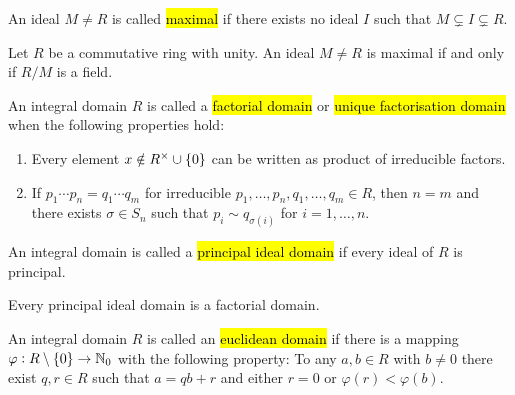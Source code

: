 \begin{definition}
	An ideal $M \neq R$ is called \hl{maximal} if there exists no ideal $I$ such that $M \subsetneq I \subsetneq R$.
\end{definition}

\vspace{1mm}

\begin{lemma}
	Let $R$ be a commutative ring with unity. An ideal $M \neq R$ is maximal if and only if $R/M$ is a field.
\end{lemma}

\vspace{1mm}

\begin{definition}
	An integral domain $R$ is called a \hl{factorial domain} or \hl{unique factorisation domain} when the following properties hold: 

	\begin{enumerate}[label = \textup{(}\roman*\textup{)}]
		\item Every element $x \notin R^\times \cup \cbr[0]{0}$ can be written as product of irreducible factors.

		\item If $p_1 \cdots p_n = q_1 \cdots q_m$ for irreducible $p_1,\dots,p_n,q_1,\dots,q_m \in R$, then $n = m$ and there exists $\sigma \in S_n$ such that $p_i \sim q_{\sigma(i)}$ for $i = 1,\dots,n$.
	\end{enumerate}
\end{definition}

\vspace{1mm}

\begin{definition}
	An integral domain is called a \hl{principal ideal domain} if every ideal of $R$ is principal.
\end{definition}

\vspace{1mm}

\begin{theorem}
	Every principal ideal domain is a factorial domain.
\end{theorem}

\vspace{1mm}

\begin{definition}
	An integral domain $R$ is called an \hl{euclidean domain} if there is a mapping $\varphi: R \setminus \cbr[0]{0} \to \mathbb{N}_0$ with the following property: To any $a,b \in R$ with $b \neq 0$ there exist $q,r \in R$ such that $a = qb + r$ and either $r = 0$ or $\varphi(r) < \varphi(b)$.
\end{definition}

